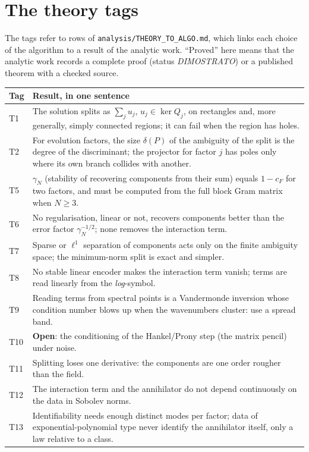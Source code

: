 \section{The theory tags}\label{app:tags}
The tags  refer to rows of \texttt{analysis/THEORY\_TO\_ALGO.md}, which links each choice of the algorithm to a result of the analytic work. ``Proved'' here means that the analytic work records a complete proof (status \emph{DIMOSTRATO}) or a published theorem with a checked source.
\begin{center}\small
\begin{tabular}{@{}L{1.0cm}L{12.0cm}@{}}
\toprule
Tag & Result, in one sentence\\\midrule
T1 & The solution splits as $\sum_j u_j$, $u_j\in\ker Q_j$, on rectangles and, more generally, simply connected regions; it can fail when the region has holes.\\
T2 & For evolution factors, the size $\delta(P)$ of the ambiguity of the split is the degree of the discriminant; the projector for factor $j$ has poles only where its own branch collides with another.\\
T5 & $\gamma_N$ (stability of recovering components from their sum) equals $1-c_F$ for two factors, and must be computed from the full block Gram matrix when $N\ge3$.\\
T6 & No regularisation, linear or not, recovers components better than the error factor $\gamma_N^{-1/2}$; none removes the interaction term.\\
T7 & Sparse or $\ell^1$ separation of components acts only on the finite ambiguity space; the minimum-norm split is exact and simpler.\\
T8 & No stable linear encoder makes the interaction term vanish; terms are read linearly from the \emph{log}-symbol.\\
T9 & Reading terms from spectral points is a Vandermonde inversion whose condition number blows up when the wavenumbers cluster: use a spread band.\\
T10 & \textbf{Open}: the conditioning of the Hankel/Prony step (the matrix pencil) under noise.\\
T11 & Splitting loses one derivative: the components are one order rougher than the field.\\
T12 & The interaction term and the annihilator do not depend continuously on the data in Sobolev norms.\\
T13 & Identifiability needs enough distinct modes per factor; data of exponential-polynomial type never identify the annihilator itself, only a law relative to a class.\\

\end{tabular}
\end{center}
